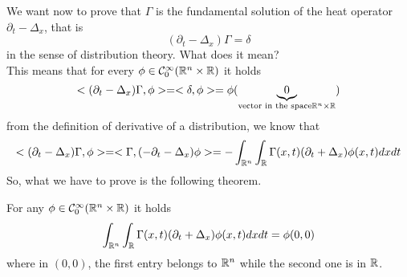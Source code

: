We want now to prove that $\Gamma$ is the fundamental solution of the heat operator $\partial_t -  \Delta_x$, that is 
\begin{equation*}
    (\partial_t - \Delta_x) \Gamma = \delta 
\end{equation*}
in the sense of distribution theory. What does it mean?\\
This means that for every $\phi \in \mathcal{C}^\infty_0(\mathbb{R}^n \times \mathbb{R})$ it holds 
\begin{equation*}
    < (\partial_t  - \Delta_x) \Gamma, \phi > = < \delta, \phi> = \phi(\underbrace{0}_{\text{vector in the space} \mathbb{R}^n \times \mathbb{R}}) 
\end{equation*}
from the definition of derivative of a distribution, we know that 
\begin{equation*}
    < (\partial_t  - \Delta_x) \Gamma, \phi > = < \Gamma, (-\partial_t - \Delta_x) \phi> = - \int_{\mathbb{R}^n} \int_{\mathbb{R}} \Gamma(x,t) (\partial_t + \Delta_x) \phi(x,t) dx dt 
\end{equation*}
So, what we have to prove is the following theorem.
\begin{ThBox}
    \begin{Th}
        For any $\phi \in \mathcal{C}^\infty_0(\mathbb{R}^n \times \mathbb{R})$ it holds 
        \begin{equation*}
            \int_{\mathbb{R}^n} \int_{\mathbb{R}} \Gamma(x,t) (\partial_t + \Delta_x) \phi(x,t) dx dt = \phi(0,0)
        \end{equation*}
        where in $(0,0)$, the first entry belongs to $\mathbb{R}^n$ while the second one is in $\mathbb{R}$.
    \end{Th}
\end{ThBox}
